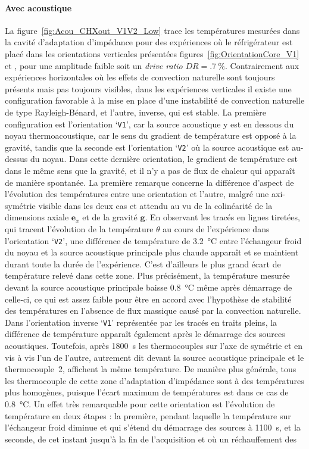 \paragraph{Avec acoustique}
La figure~\ref{fig:Acou_CHXout_V1V2_Low} trace les températures mesurées dans la cavité d'adaptation d'impédance pour des expériences où le réfrigérateur est placé dans les orientations verticales présentées figures~\ref{fig:OrientationCore_V1} et , pour une amplitude \og faible \fg{} soit un \textit{drive ratio} $DR=\qty{.7}{\percent}$. Contrairement aux expériences horizontales où les effets de convection naturelle sont toujours présents mais pas toujours visibles, dans les expériences verticales il existe une configuration favorable à la mise en place d'une instabilité de convection naturelle de type Rayleigh-Bénard, et l'autre, inverse, qui est stable. La première configuration est l'orientation `\texttt{V1}', car la source acoustique y est en dessous du noyau thermoacoustique, car le sens du gradient de température est opposé à la gravité, tandis que la seconde est l'orientation `\texttt{V2}' où la source acoustique est au-dessus du noyau. Dans cette dernière orientation, le gradient de température est dans le même sens que la gravité, et il n'y a pas de flux de chaleur qui apparaît de manière spontanée. La première remarque concerne la différence d'aspect de l'évolution des températures entre une orientation et l'autre, malgré une axi-symétrie visible dans les deux cas et attendu au vu de la colinéarité de la dimensions axiale $\mathbf e_x$ et de la gravité $\mathbf g$. En observant les tracés en lignes tiretées, qui tracent l'évolution de la température $\theta$ au cours de l'expérience dans l'orientation `\texttt{V2}', une différence de température de \qty{3.2}{\degreeCelsius} entre l'échangeur froid du noyau et la source acoustique principale plus chaude apparaît et se maintient durant toute la durée de l'expérience. C'est d'ailleurs le plus grand écart de température relevé dans cette zone. Plus précisément, la température mesurée devant la source acoustique principale baisse \qty{.8}{\degreeCelsius} même après démarrage de celle-ci, ce qui est assez faible pour être en accord avec l'hypothèse de stabilité des températures en l'absence de flux massique causé par la convection naturelle. Dans l'orientation inverse `\texttt{V1}' représentée par les tracés en traits pleins, la différence de température apparaît également après le démarrage des sources acoustiques. Toutefois, après \qty{1800}{\second} les thermocouples sur l'axe de symétrie et en vis à vis l'un de l'autre, autrement dit devant la source acoustique principale et le thermocouple~2, affichent la même température. De manière plus générale, tous les thermocouple de cette zone d'adaptation d'impédance sont à des températures plus homogènes, puisque l'écart maximum de températures est dans ce cas de \qty{.8}{\degreeCelsius}. Un effet très remarquable pour cette orientation est l'évolution de température en deux étapes : la première, pendant laquelle la température sur l'échangeur froid diminue et qui s'étend du démarrage des sources à \qty{1100}{\second}, et la seconde, de cet instant jusqu'à la fin de l'acquisition et où un réchauffement des 